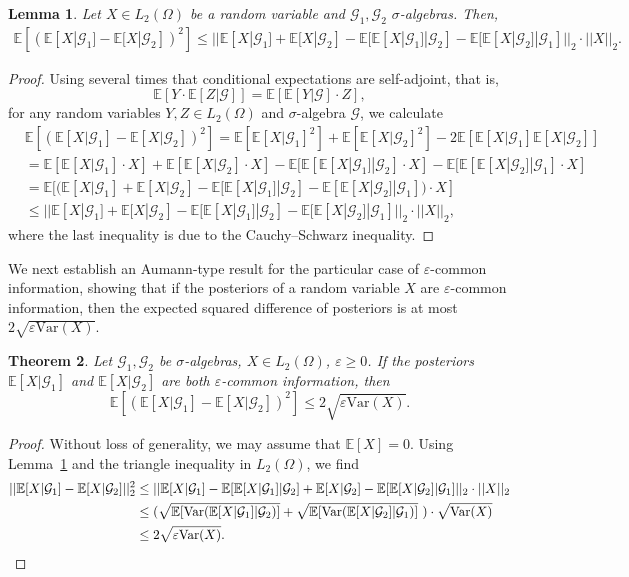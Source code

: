 \documentclass[a4paper, 10pt]{article}
\newtheorem{theorem}{Theorem}
\numberwithin{theorem}{section}
\newtheorem{lemma}[theorem]{Lemma}
\theoremstyle{definition}
\newcommand{\E}{\mathbb{E}}
\newcommand{\G}{\mathcal{G}}
\newcommand{\Var}{\mathrm{Var}}
\renewcommand{\epsilon}{\varepsilon}
\begin{document}
\begin{lemma}\label{lemma:hilbert}
	Let $X \in L_2(\Omega)$ be a random variable and $\G_1,\G_2$ $\sigma$-algebras. 
	Then,
	\begin{align*}	
	 \E[(\E[X|\G_1]-\E[X|\G_2])^2] 
	\leq ||\E[X|\G_1]+ \E[X|\G_2]-\E[\E[X|\G_1]|\G_2]-\E[\E[X|\G_2]|\G_1]||_2 \cdot ||X||_2.\end{align*}
\end{lemma}


\begin{proof}
	Using several times that conditional expectations are self-adjoint, that is, 
	$$\E[Y \cdot \E[Z|\G]] = \E[\E[Y|\G] \cdot Z],$$
	for any random variables $Y,Z \in L_2(\Omega)$ and $\sigma$-algebra $\G$,
	 we calculate
	\begin{align*}
		&\E[(\E[X|\G_1]-\E[X|\G_2])^2] = \E[\E[X|\G_1]^2] + \E[\E[X|\G_2]^2] - 2 \E[\E[X|\G_1]\E[X|\G_2]]\\
		&=\E[ \E[X|\G_1] \cdot X] + \E[\E[X|\G_2] \cdot X] - \E[ \E[\E[X|\G_1]|\G_2] \cdot X] - \E[ \E[\E[X|\G_2]|\G_1] \cdot X] \\
		&=\E[(\E[X|\G_1] +  \E[X|\G_2] -  \E[\E[X|\G_1]|\G_2] -  \E[\E[X|\G_2]|\G_1]) \cdot X] \\
		&\leq ||\E[X|\G_1]+ \E[X|\G_2]-\E[\E[X|\G_1]|\G_2]-\E[\E[X|\G_2]|\G_1]||_2 \cdot ||X||_2,
	\end{align*}
where the last inequality is due to the Cauchy–Schwarz inequality.
\end{proof}

We next establish an Aumann-type result for the particular case of $\epsilon$-common information, showing that if the posteriors of a random variable $X$ are $\epsilon$-common information, then the expected squared difference of posteriors is at most $2\sqrt{\epsilon\Var(X)}$.


\begin{theorem}\label{theo:globalaumann}
	Let $\G_1, \G_2$ be $\sigma$-algebras, $X\in L_2(\Omega)$, $\epsilon \geq 0$. If the posteriors $  \E[X|\G_1]$ and $\E[X|\G_2]$ are both $\epsilon$-common information, then  
	$$\E [ (\E[X|\G_1]-\E[X|\G_2])^2  ] \leq 2\sqrt{\epsilon \Var(X)}.$$
\end{theorem}	


\begin{proof}
	Without loss of generality, we may assume that $\E[X]=0$. Using Lemma~\ref{lemma:hilbert} and the triangle inequality in $L_2(\Omega)$, we find
	\begin{align*}
		|| \E[X|\G_1]- \E[X|\G_2]||_2^2 & \leq ||\E[X|\G_1] -  \E[ \E[X|\G_1] |\G_2] + \E[X|\G_2] -  \E[ \E[X|\G_2] |\G_1]||_2 \cdot ||X||_2  \\
		&\leq (\sqrt{\E [\Var( \E[X|\G_1]|\G_2)]} + \sqrt{\E [\Var( \E[X|\G_2]|\G_1)]}\ ) \cdot \sqrt{\Var (X)}  \\
		&\leq 2 \sqrt{\epsilon \Var(X)}.\qedhere
	\end{align*}
    
\end{proof}
\end{document}

